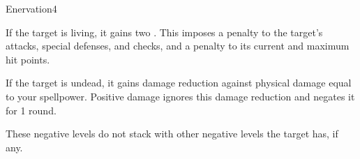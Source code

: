 \begin{spellsection}{Enervation}{4}
    \begin{spellheader}
    \end{spellheader}
    \begin{spellcontent}
        \begin{spelltargetinginfo}
        \end{spelltargetinginfo}
        \begin{spelleffects}
            \spelleffect If the target is living, it gains two . This imposes a  penalty to the target's attacks, special defenses, and checks, and a  penalty to its current and maximum hit points.

            If the target is undead, it gains damage reduction against physical damage equal to your spellpower. Positive damage ignores this damage reduction and negates it for 1 round.
        \end{spelleffects}
    \end{spellcontent}
    \begin{spellfooter}
        \spellnotes These negative levels do not stack with other negative levels the target has, if any.
        \miscastrandom
    \end{spellfooter}
\end{spellsection}


